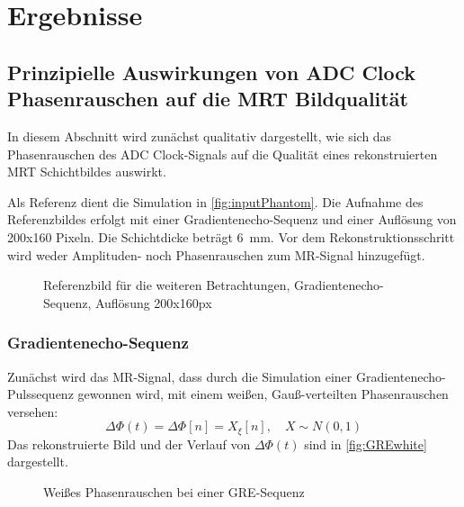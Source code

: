 \chapter{Ergebnisse}

\section{Prinzipielle Auswirkungen von ADC Clock Phasenrauschen auf die MRT Bildqualität}
In diesem Abschnitt wird zunächst qualitativ dargestellt, wie sich das Phasenrauschen des ADC Clock-Signals auf die Qualität eines rekonstruierten MRT Schichtbildes auswirkt.

Als Referenz dient die Simulation in \autoref{fig:inputPhantom}. Die Aufnahme des Referenzbildes erfolgt mit einer Gradientenecho-Sequenz und einer Auflösung von 200x160 Pixeln. Die Schichtdicke beträgt \SI{6}{\mm}. Vor dem Rekonstruktionsschritt wird weder Amplituden- noch Phasenrauschen zum MR-Signal hinzugefügt.

\begin{figure}[H]
	\centering
	\caption[Referenz für die Simulation]{Referenzbild für die weiteren Betrachtungen, Gradientenecho-Sequenz, Auflösung 200x160px}
	\label{fig:inputPhantom}
\end{figure}

\subsection{Gradientenecho-Sequenz}
Zunächst wird das MR-Signal, dass durch die Simulation einer Gradientenecho-Pulssequenz gewonnen wird, mit einem weißen, Gauß-verteilten Phasenrauschen versehen:
\begin{equation}
	\label{eq:greWhite}
	\Delta \Phi(t)=\Delta \Phi[n]=X_{\xi}[n], \quad X \sim N(0,1)
\end{equation}
Das rekonstruierte Bild und der Verlauf von $\Delta \Phi(t)$ sind in \autoref{fig:GREwhite} dargestellt.

\begin{figure}[H]
	\centering
	\hfill
	
	\caption{Weißes Phasenrauschen bei einer GRE-Sequenz}
	\label{fig:GREwhite}	
\end{figure}

